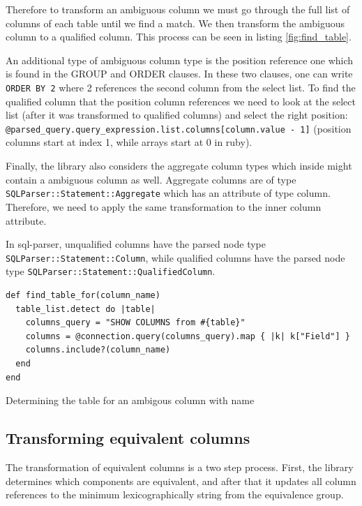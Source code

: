 Therefore to transform an ambiguous column we must go through the full list of columns of each table until we find a match. We then transform the ambiguous column to a qualified column. This process can be seen in listing \ref{fig:find_table}.

An additional type of ambiguous column type is the position reference one which is found in the GROUP and ORDER clauses. In these two clauses, one can write \texttt{ORDER BY 2} where 2 references the second column from the select list. To find the qualified column that the position column references we need to look at the select list (after it was transformed to qualified columns) and select the right position: \texttt{@parsed_query.query_expression.list.columns[column.value - 1]} (position columns start at index 1, while arrays start at 0 in ruby).

Finally, the library also considers the aggregate column types which inside might contain a ambiguous column as well. Aggregate columns are of type \texttt{SQLParser::Statement::Aggregate} which has an attribute of type column. Therefore, we need to apply the same transformation to the inner column attribute.

In sql-parser, unqualified columns have the parsed node type \texttt{SQLParser::Statement::Column}, while qualified columns have the parsed node type \texttt{SQLParser::Statement::QualifiedColumn}.

\begin{listing}
\begin{verbatim}
def find_table_for(column_name)
  table_list.detect do |table|
    columns_query = "SHOW COLUMNS from #{table}"
    columns = @connection.query(columns_query).map { |k| k["Field"] }
    columns.include?(column_name)
  end
end
\end{verbatim}
\caption{Determining the table for an ambigous column with name}
\label{fig:find_table}
\end{listing}


\subsection{Transforming equivalent columns}

The transformation of equivalent columns is a two step process. First, the library determines which components are equivalent, and after that it updates all column references to the minimum lexicographically string from the equivalence group.

